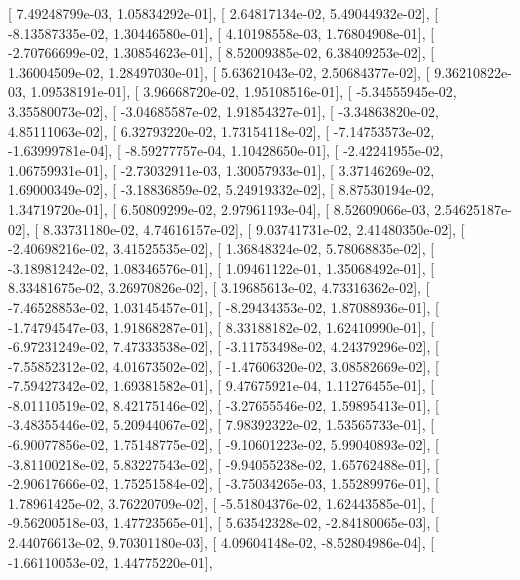 \documentclass{article}
\begin{document}
       [  7.49248799e-03,   1.05834292e-01],
       [  2.64817134e-02,   5.49044932e-02],
       [ -8.13587335e-02,   1.30446580e-01],
       [  4.10198558e-03,   1.76804908e-01],
       [ -2.70766699e-02,   1.30854623e-01],
       [  8.52009385e-02,   6.38409253e-02],
       [  1.36004509e-02,   1.28497030e-01],
       [  5.63621043e-02,   2.50684377e-02],
       [  9.36210822e-03,   1.09538191e-01],
       [  3.96668720e-02,   1.95108516e-01],
       [ -5.34555945e-02,   3.35580073e-02],
       [ -3.04685587e-02,   1.91854327e-01],
       [ -3.34863820e-02,   4.85111063e-02],
       [  6.32793220e-02,   1.73154118e-02],
       [ -7.14753573e-02,  -1.63999781e-04],
       [ -8.59277757e-04,   1.10428650e-01],
       [ -2.42241955e-02,   1.06759931e-01],
       [ -2.73032911e-03,   1.30057933e-01],
       [  3.37146269e-02,   1.69000349e-02],
       [ -3.18836859e-02,   5.24919332e-02],
       [  8.87530194e-02,   1.34719720e-01],
       [  6.50809299e-02,   2.97961193e-04],
       [  8.52609066e-03,   2.54625187e-02],
       [  8.33731180e-02,   4.74616157e-02],
       [  9.03741731e-02,   2.41480350e-02],
       [ -2.40698216e-02,   3.41525535e-02],
       [  1.36848324e-02,   5.78068835e-02],
       [ -3.18981242e-02,   1.08346576e-01],
       [  1.09461122e-01,   1.35068492e-01],
       [  8.33481675e-02,   3.26970826e-02],
       [  3.19685613e-02,   4.73316362e-02],
       [ -7.46528853e-02,   1.03145457e-01],
       [ -8.29434353e-02,   1.87088936e-01],
       [ -1.74794547e-03,   1.91868287e-01],
       [  8.33188182e-02,   1.62410990e-01],
       [ -6.97231249e-02,   7.47333538e-02],
       [ -3.11753498e-02,   4.24379296e-02],
       [ -7.55852312e-02,   4.01673502e-02],
       [ -1.47606320e-02,   3.08582669e-02],
       [ -7.59427342e-02,   1.69381582e-01],
       [  9.47675921e-04,   1.11276455e-01],
       [ -8.01110519e-02,   8.42175146e-02],
       [ -3.27655546e-02,   1.59895413e-01],
       [ -3.48355446e-02,   5.20944067e-02],
       [  7.98392322e-02,   1.53565733e-01],
       [ -6.90077856e-02,   1.75148775e-02],
       [ -9.10601223e-02,   5.99040893e-02],
       [ -3.81100218e-02,   5.83227543e-02],
       [ -9.94055238e-02,   1.65762488e-01],
       [ -2.90617666e-02,   1.75251584e-02],
       [ -3.75034265e-03,   1.55289976e-01],
       [  1.78961425e-02,   3.76220709e-02],
       [ -5.51804376e-02,   1.62443585e-01],
       [ -9.56200518e-03,   1.47723565e-01],
       [  5.63542328e-02,  -2.84180065e-03],
       [  2.44076613e-02,   9.70301180e-03],
       [  4.09604148e-02,  -8.52804986e-04],
       [ -1.66110053e-02,   1.44775220e-01],
\end{document}
